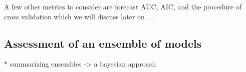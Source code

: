\noindent A few other metrics to consider are forecast AUC, AIC, and the procedure of cross validation which we will discuss later on ....\newline

\subsection{Assessment of an ensemble of models}
* summarizing ensembles -> a bayesian approach \newline




